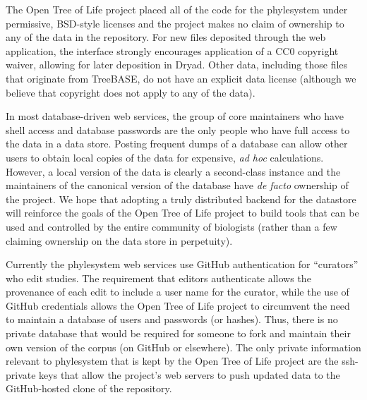 \documentclass{bioinfo}
\newcommand{\ps}{phylesystem\xspace}
\newcommand{\otol}{Open Tree of Life\xspace}
\begin{document}
The \otol project placed all of the code for the \ps under permissive, BSD-style licenses and the
    project makes no claim of ownership to any of the data in the repository. 
For new files deposited through the web application, the interface strongly encourages application of a CC0 copyright waiver, 
    allowing for later deposition in Dryad. Other data, including those files that originate from TreeBASE,
    do not have an explicit data license (although we believe that copyright does not apply to any of the data).

In most database-driven web services, the group of core maintainers who have shell access and 
    database passwords are the only people who have full access to the data in a data store.
Posting frequent dumps of a database can allow other users to obtain local copies of the data 
    for expensive, {\em ad hoc} calculations.
However, a local version of the data is clearly a second-class instance and the maintainers of the 
    canonical version of the database have {\em de facto} ownership of the project.
We hope that adopting a truly distributed backend for the datastore will reinforce the goals
    of the \otol project to build tools that can be used and controlled by the entire community of biologists 
    (rather than a few claiming ownership on the data store in perpetuity).

Currently the \ps web services use GitHub authentication for ``curators'' who edit studies.
The requirement that editors authenticate allows the provenance of each edit to include 
    a user name for the curator, while the use of GitHub credentials allows the \otol project
    to circumvent the need to maintain a database of users and passwords (or hashes).
Thus, there is no private database that would be required for someone to fork and maintain their
    own version of the corpus (on GitHub or elsewhere).
The only private information relevant to \ps that is kept by the \otol project are the ssh-private
    keys that allow the project's web servers to push updated data to the GitHub-hosted clone of the 
    repository.
\end{document}
